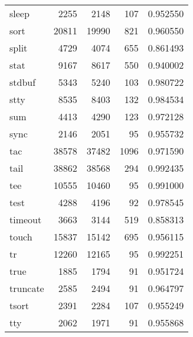 \begin{tabular}{lrrrr}
sleep     &                     2255 &         2148 &           107 &                 0.952550 \\
sort      &                    20811 &        19990 &           821 &                 0.960550 \\
split     &                     4729 &         4074 &           655 &                 0.861493 \\
stat      &                     9167 &         8617 &           550 &                 0.940002 \\
stdbuf    &                     5343 &         5240 &           103 &                 0.980722 \\
stty      &                     8535 &         8403 &           132 &                 0.984534 \\
sum       &                     4413 &         4290 &           123 &                 0.972128 \\
sync      &                     2146 &         2051 &            95 &                 0.955732 \\
tac       &                    38578 &        37482 &          1096 &                 0.971590 \\
tail      &                    38862 &        38568 &           294 &                 0.992435 \\
tee       &                    10555 &        10460 &            95 &                 0.991000 \\
test      &                     4288 &         4196 &            92 &                 0.978545 \\
timeout   &                     3663 &         3144 &           519 &                 0.858313 \\
touch     &                    15837 &        15142 &           695 &                 0.956115 \\
tr        &                    12260 &        12165 &            95 &                 0.992251 \\
true      &                     1885 &         1794 &            91 &                 0.951724 \\
truncate  &                     2585 &         2494 &            91 &                 0.964797 \\
tsort     &                     2391 &         2284 &           107 &                 0.955249 \\
tty       &                     2062 &         1971 &            91 &                 0.955868 \\

\end{tabular}
